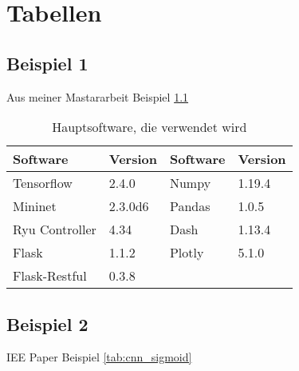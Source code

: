 \chapter{Tabellen}

\section{Beispiel 1}

Aus meiner Mastararbeit Beispiel \ref{tab:Software}

\begin{table}[ht]
  	\centering
  	\begin{tabular}{@{}*{4}{l}@{}}
  		\toprule
  		    \textbf{Software} & \textbf{Version} & \textbf{Software} & \textbf{Version}\\ 
  		\midrule
  		    Tensorflow & 2.4.0 &  Numpy & 1.19.4 \\
  		    Mininet & 2.3.0d6 & Pandas & 1.0.5 \\
  		    Ryu Controller & 4.34 & Dash & 1.13.4 \\
  		    Flask & 1.1.2 & Plotly & 5.1.0 \\
  		    Flask-Restful & 0.3.8 &  &  \\
  		\bottomrule
  	\end{tabular}
  	  	  \caption{Hauptsoftware, die verwendet wird}
  \label{tab:Software}
\end{table} 

\section{Beispiel 2}

IEE Paper Beispiel \ref{tab:cnn_sigmoid}

